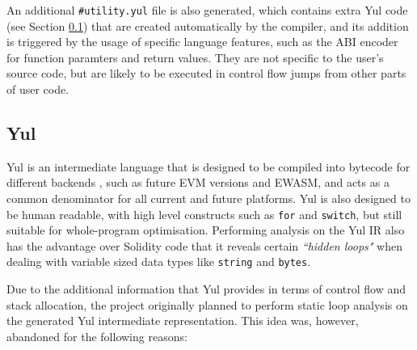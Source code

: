 An additional \texttt{\#utility.yul} file is also generated, which contains extra Yul code (see Section \ref{section:Yul}) that are
created automatically by the compiler, and its addition is triggered by the usage of
specific language features, such as the ABI encoder for function paramters and return values.
They are not specific to the user's source code, but are likely to be executed in control flow
jumps from other parts of user code.


\subsection{Yul}
\label{section:Yul}

Yul is an intermediate language that is designed to be compiled into bytecode for different
backends \cite{solcyul}, such as future EVM versions and EWASM, and acts as a common denominator
for all current and future platforms. Yul is also designed to be human readable, with high level constructs
such as \texttt{for} and \texttt{switch}, but still suitable for whole-program optimisation. Performing 
analysis on the Yul IR also has the advantage over Solidity code that it 
reveals certain \textit{``hidden loops"} when dealing with variable sized data types 
like \texttt{string} and \texttt{bytes}. 

Due to the additional information that Yul provides in terms of control flow and stack allocation,
the project originally planned to perform static loop analysis on the generated Yul intermediate
representation. This idea was, however, abandoned for the following reasons:

